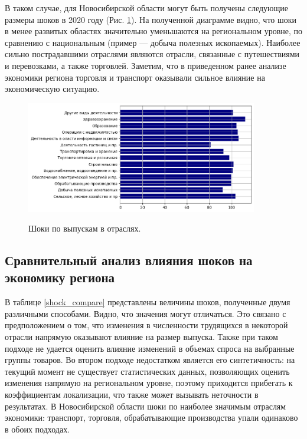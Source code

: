 \documentclass[12pt, a4paper]{article}
\begin{document}
В таком случае, для Новосибирской области могут быть получены следующие размеры шоков в 2020 году (Рис. \ref{vvp_novosib}). На полученной диаграмме видно, что шоки в менее развитых областях значительно уменьшаются на региональном уровне, по сравнению с национальным (пример --- добыча полезных ископаемых).
Наиболее сильно пострадавшими отраслями являются отрасли, связанные с путешествиями и перевозками, а также торговлей. Заметим, что в приведенном ранее анализе экономики региона торговля и транспорт оказывали сильное влияние на экономическую ситуацию.
\begin{figure}
\includegraphics[width=0.9\textwidth]{pictures/vvp_novosib.png}\
\caption{Шоки по выпускам в отраслях.}
\label{vvp_novosib}
\end{figure}


\subsection{Сравнительный анализ влияния шоков на экономику региона}

В таблице \ref{shock_compare} представлены величины шоков, полученные двумя различными способами. Видно, что значения могут отличаться. Это связано с предположением о том, что изменения в численности трудящихся в некоторой отрасли напрямую оказывают влияние на размер выпуска. Также при таком подходе не удается оценить влияние изменений в объемах спроса на выбранные группы товаров. Во втором подходе недостатком является его синтетичность: на текущий момент не существует статистических данных, позволяющих оценить изменения напрямую на региональном уровне, поэтому приходится прибегать к коэффициентам локализации, что также может вызывать неточности в результатах. В Новосибирской области шоки по наиболее значимым отраслям экономики: транспорт, торговля, обрабатывающие производства упали одинаково в обоих подходах.
\end{document}
